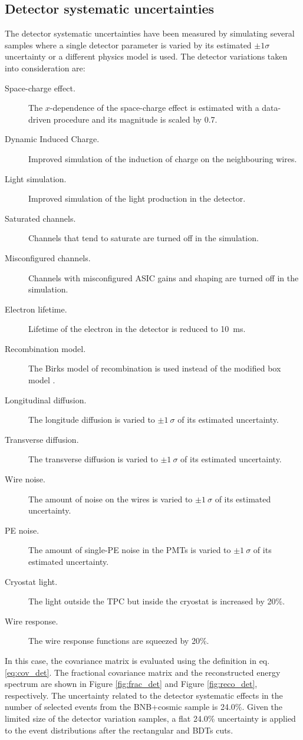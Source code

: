 \subsection{Detector systematic uncertainties}
The detector systematic uncertainties have been measured by simulating several samples where a single detector parameter is varied by its estimated $\pm1\sigma$ uncertainty or a different physics model is used. The detector variations taken into consideration are:
\begin{description}
\item[Space-charge effect.] The $x$-dependence of the space-charge effect is estimated with a data-driven procedure and its magnitude is scaled by 0.7.
\item[Dynamic Induced Charge.] Improved simulation of the induction of charge on the neighbouring wires.
\item[Light simulation.] Improved simulation of the light production in the detector.
\item[Saturated channels.] Channels that tend to saturate are turned off in the simulation.
\item[Misconfigured channels.] Channels with misconfigured ASIC gains and shaping are turned off in the simulation.
\item[Electron lifetime.] Lifetime of the electron in the detector is reduced to 10~ms.
\item[Recombination model.] The Birks model of recombination \cite{Amoruso:2004dy} is used instead of the modified box model \cite{Acciarri:2013met}. 
\item[Longitudinal diffusion.] The longitude diffusion is varied to $\pm1~\sigma$ of its estimated uncertainty.
\item[Transverse diffusion.] The transverse diffusion is varied to $\pm1~\sigma$ of its estimated uncertainty.
\item[Wire noise.] The amount of noise on the wires is varied to $\pm1~\sigma$ of its estimated uncertainty.
\item[PE noise.] The amount of single-PE noise in the PMTs is varied to $\pm1~\sigma$ of its estimated uncertainty.
\item[Cryostat light.] The light outside the TPC but inside the cryostat is increased by 20\%.
\item[Wire response.] The wire response functions are squeezed by 20\%.
\end{description}

In this case, the covariance matrix is evaluated using the definition in eq. \eqref{eq:cov_det}. The fractional covariance matrix and the reconstructed energy spectrum are shown in Figure \ref{fig:frac_det} and Figure \ref{fig:reco_det}, respectively.
The uncertainty related to the detector systematic effects in the number of selected events from the BNB+cosmic sample is 24.0\%. Given the limited size of the detector variation samples, a flat 24.0\% uncertainty is applied to the event distributions after the rectangular and BDTs cuts.

